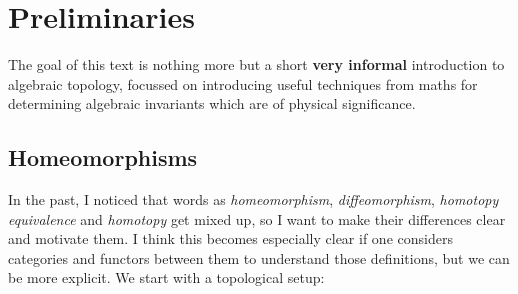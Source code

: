 \chapter{Preliminaries}
\label{chap:matint}
\vspace*{-0.9cm}


The goal of this text is nothing more but a short \textbf{very informal} introduction to algebraic topology, focussed on introducing useful techniques from maths for determining algebraic invariants which are of physical significance.

\section{Homeomorphisms}
In the past, I noticed that words as \emph{homeomorphism}, \emph{diffeomorphism}, \emph{homotopy equivalence} and \emph{homotopy} get mixed up, so I want to make their differences clear and motivate them. I think this becomes especially clear if one considers categories and functors between them to understand those definitions, but we can be more explicit. We start with a topological setup:
